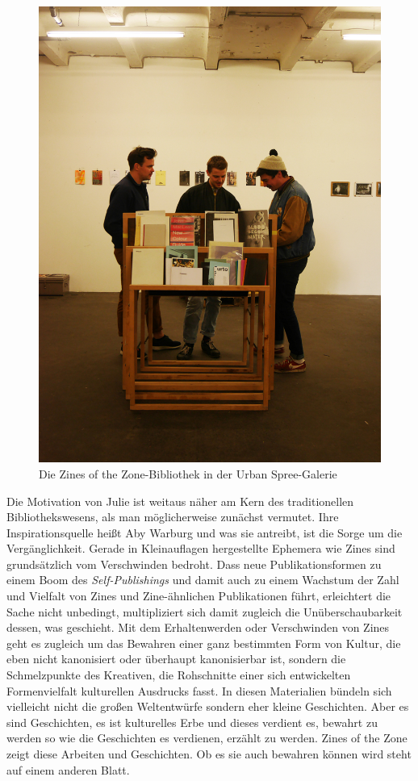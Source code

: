 \documentclass[a4paper,
fontsize=11pt,
oneside,
numbers=noperiodatend,
parskip=half-,
bibliography=totoc,
final
]{scrartcl}
\begin{document}
\begin{figure}[htbp]
\centering
\includegraphics{img/zineurbanspree.jpg}
\caption{Die Zines of the Zone-Bibliothek in der Urban Spree-Galerie}
\end{figure}

Die Motivation von Julie ist weitaus näher am Kern des traditionellen
Bibliothekswesens, als man möglicherweise zunächst vermutet. Ihre
Inspirationsquelle heißt Aby Warburg und was sie antreibt, ist die Sorge
um die Vergänglichkeit. Gerade in Kleinauflagen hergestellte Ephemera
wie Zines sind grundsätzlich vom Verschwinden bedroht. Dass neue
Publikationsformen zu einem Boom des \emph{Self-Publishings} und damit
auch zu einem Wachstum der Zahl und Vielfalt von Zines und
Zine-ähnlichen Publikationen führt, erleichtert die Sache nicht
unbedingt, multipliziert sich damit zugleich die Unüberschaubarkeit
dessen, was geschieht. Mit dem Erhaltenwerden oder Verschwinden von
Zines geht es zugleich um das Bewahren einer ganz bestimmten Form von
Kultur, die eben nicht kanonisiert oder überhaupt kanonisierbar ist,
sondern die Schmelzpunkte des Kreativen, die Rohschnitte einer sich
entwickelten Formenvielfalt kulturellen Ausdrucks fasst. In diesen
Materialien bündeln sich vielleicht nicht die großen Weltentwürfe
sondern eher kleine Geschichten. Aber es sind Geschichten, es ist
kulturelles Erbe und dieses verdient es, bewahrt zu werden so wie die
Geschichten es verdienen, erzählt zu werden. Zines of the Zone zeigt
diese Arbeiten und Geschichten. Ob es sie auch bewahren können wird
steht auf einem anderen Blatt.
\end{document}
